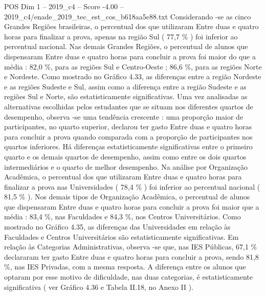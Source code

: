 \begin{textsample}{POS Dim 1 – 2019\_c4 – Score -4.00 – 2019\_c4/enade\_2019\_tec\_est\_cos\_b618aa5e88.txt}
Considerando -se as cinco Grandes Regiões brasileiras, o percentual dos que utilizaram Entre duas e quatro horas para finalizar a prova, apenas na região Sul ( 77,7 \% ) foi inferior ao percentual nacional.
Nas demais Grandes Regiões, o percentual de alunos que dispensaram Entre duas e quatro horas para concluir a prova foi maior do que a média : 82,0 \%, para as regiões Sul e Centro-Oeste ; 86,6 \%, para as regiões Norte e Nordeste.
Como mostrado no Gráfico 4.33, as diferenças entre a região Nordeste e as regiões Sudeste e Sul, assim como a diferença entre a região Sudeste e as regiões Sul e Norte, são estatisticamente significativas.
Uma vez analisadas as alternativas escolhidas pelos estudantes que se situam nos diferentes quartos de desempenho, observa -se uma tendência crescente : uma proporção maior de participantes, no quarto superior, declarou ter gasto Entre duas e quatro horas para concluir a prova quando comparada com a proporção de participantes nos quartos inferiores.
Há diferenças estatisticamente significativas entre o primeiro quarto e os demais quartos de desempenho, assim como entre os dois quartos intermediários e o quarto de melhor desempenho.
Na análise por Organização Acadêmica, o percentual dos que utilizaram Entre duas e quatro horas para finalizar a prova nas Universidades ( 78,4 \% ) foi inferior ao percentual nacional ( 81,5 \% ).
Nos demais tipos de Organização Acadêmica, o percentual de alunos que dispensaram Entre duas e quatro horas para concluir a prova foi maior que a média : 83,4 \%, nas Faculdades e 84,3 \%, nos Centros Universitários.
Como mostrado no Gráfico 4.35, as diferenças das Universidades em relação às Faculdades e Centros Universitários são estatisticamente significativas.
Em relação às Categorias Administrativas, observa -se que, nas IES Públicas, 67,1 \% declararam ter gasto Entre duas e quatro horas para concluir a prova, sendo 81,8 \%, nas IES Privadas, com a mesma resposta.
A diferença entre os alunos que optaram por esse motivo de dificuldade, nas duas categorias, é estatisticamente significativa ( ver Gráfico 4.36 e Tabela II.18, no Anexo II ).

\end{textsample}
